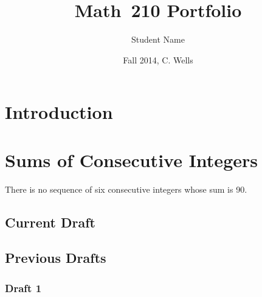 \documentclass[12pt,pdftex]{article}
\title{Math~210 Portfolio}
\date{Fall 2014, C. Wells}
\author{Student Name}
\begin{document}
\maketitle
\tableofcontents
\section{Introduction}

\section{Sums of Consecutive Integers}
\begin{thm}
There is no sequence of six consecutive integers whose sum is 90.
\end{thm}
\subsection{Current Draft}

\subsection{Previous Drafts}
\subsubsection{Draft 1}

\end{document}
